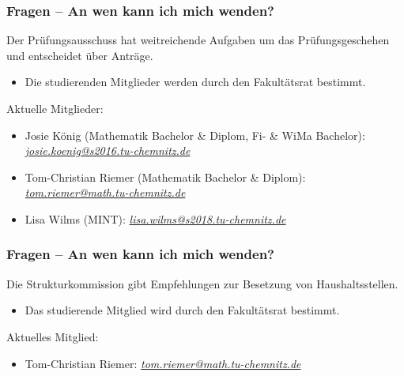 \documentclass[10pt]{beamer}
\makeatletter
\newcommand{\highl}[1]{\color{tuccolor@ma}#1\color{black}}
\makeatother
\begin{document}
\begin{frame}
	\frametitle{Fragen -- An wen kann ich mich wenden?}

	\begin{block}{\vphantom{X}}
		Der Prüfungsausschuss hat weitreichende Aufgaben um das Prüfungsgeschehen und entscheidet über Anträge.
	\end{block}

	\begin{itemize}
		\item Die studierenden Mitglieder werden durch den Fakultätsrat bestimmt.
	\end{itemize}

	\vspace*{0.5cm}

	Aktuelle Mitglieder:

	\begin{itemize}
		\item Josie König (Mathematik Bachelor \& Diplom, Fi- \& WiMa Bachelor): \highl{\textit{\href{mailto:josie.koenig@s2016.tu-chemnitz.de}{josie.koenig@s2016.tu-chemnitz.de}}}
		\item Tom-Christian Riemer (Mathematik Bachelor \& Diplom): \highl{\textit{\href{mailto:tom.riemer@math.tu-chemnitz.de}{tom.riemer@math.tu-chemnitz.de}}}
		\item Lisa Wilms (MINT): \highl{\textit{\href{mailto:lisa.wilms@s2018.tu-chemnitz.de}{lisa.wilms@s2018.tu-chemnitz.de}}}
	\end{itemize}
\end{frame}

\begin{frame}
	\frametitle{Fragen -- An wen kann ich mich wenden?}

	\begin{block}{\vphantom{X}}
		Die Strukturkommission gibt Empfehlungen zur Besetzung von Haushaltsstellen.
	\end{block}

	\begin{itemize}
		\item Das studierende Mitglied wird durch den Fakultätsrat bestimmt.
	\end{itemize}

	\vspace*{1.0cm}

	Aktuelles Mitglied:

	\begin{itemize}
		\item Tom-Christian Riemer: \highl{\textit{\href{mailto:tom.riemer@math.tu-chemnitz.de}{tom.riemer@math.tu-chemnitz.de}}}
	\end{itemize}
\end{frame}
\end{document}
